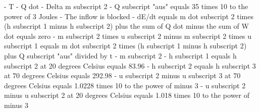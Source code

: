 - T
- Q dot
- Delta m subscript 2
- Q subscript "aus" equals 35 times 10 to the power of 3 Joules
- The inflow is blocked
- dE/dt equals m dot subscript 2 times (h subscript 1 minus h subscript 2) plus the sum of Q dot minus the sum of W dot equals zero
- m subscript 2 times u subscript 2 minus m subscript 2 times u subscript 1 equals m dot subscript 2 times (h subscript 1 minus h subscript 2) plus Q subscript "aus" divided by t
- m subscript 2
- h subscript 1 equals h subscript 2 at 20 degrees Celsius equals 83.96
- h subscript 2 equals h subscript 3 at 70 degrees Celsius equals 292.98
- u subscript 2 minus u subscript 3 at 70 degrees Celsius equals 1.0228 times 10 to the power of minus 3
- u subscript 2 minus u subscript 2 at 20 degrees Celsius equals 1.018 times 10 to the power of minus 3